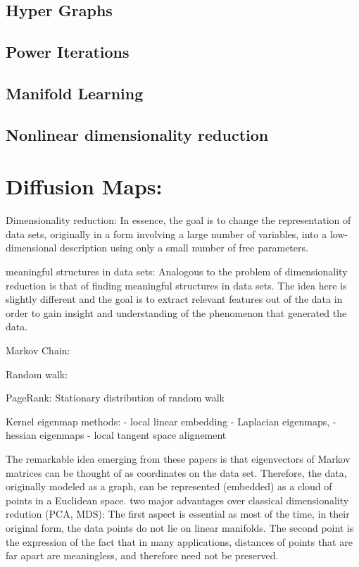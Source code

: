 \subsection{Hyper Graphs}
\subsection{Power Iterations}
\subsection{Manifold Learning}
\subsection{Nonlinear dimensionality reduction}


\section{Diffusion Maps:}
\citet{diffusionMaps}
\cite{diffusionMaps}

Dimensionality reduction:
In essence, the goal is to change the representation of data sets, originally in a form involving a large number of variables, into a
low-dimensional description using only a small number of free parameters.

meaningful structures in data sets:
Analogous to the problem of dimensionality reduction is that of finding meaningful structures in data sets. The idea here is slightly
different and the goal is to extract relevant features out of the data in order to gain insight and understanding of the
phenomenon that generated the data.

Markov Chain:

Random walk:

PageRank:
Stationary distribution of random walk

Kernel eigenmap methods:
- local linear embedding
- Laplacian eigenmaps,
- hessian eigenmaps
- local tangent space alignement

The remarkable idea emerging from these papers is that eigenvectors of Markov matrices can be thought of as coordinates
on the data set. Therefore, the data, originally modeled as a graph, can be represented (embedded) as a cloud of points
in a Euclidean space.
two major advantages over classical dimensionality redution (PCA, MDS):
The first aspect is essential as most of the time, in their original form, the data points do not lie on
 linear manifolds.
 The second point is the expression of the fact that in many
applications, distances of points that are far apart are meaningless, and therefore need not be preserved.

